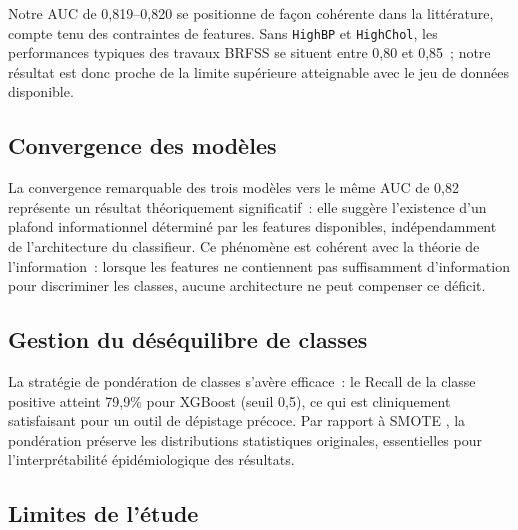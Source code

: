 Notre AUC de 0,819--0,820 se positionne de façon cohérente dans la littérature,
compte tenu des contraintes de features. Sans \texttt{HighBP} et \texttt{HighChol},
les performances typiques des travaux BRFSS se situent entre 0,80 et 0,85~;
notre résultat est donc proche de la limite supérieure atteignable avec le jeu
de données disponible.

\subsection{Convergence des modèles}

La convergence remarquable des trois modèles vers le même AUC de 0,82 représente
un résultat théoriquement significatif~: elle suggère l'existence d'un plafond
informationnel déterminé par les features disponibles, indépendamment de
l'architecture du classifieur. Ce phénomène est cohérent avec la théorie de
l'information~: lorsque les features ne contiennent pas suffisamment d'information
pour discriminer les classes, aucune architecture ne peut compenser ce déficit.

\subsection{Gestion du déséquilibre de classes}

La stratégie de pondération de classes s'avère efficace~: le Recall de la classe
positive atteint 79,9\% pour XGBoost (seuil 0,5), ce qui est cliniquement
satisfaisant pour un outil de dépistage précoce. Par rapport à SMOTE \cite{chawla2002smote},
la pondération préserve les distributions statistiques originales, essentielles
pour l'interprétabilité épidémiologique des résultats.

\subsection{Limites de l'étude}

